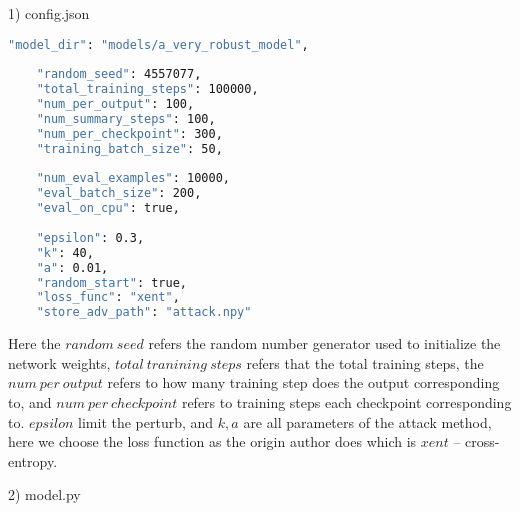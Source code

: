 \documentclass[
	letterpaper, %
	10pt, %
]{CSUniSchoolLabReport}
\begin{document}
1) config.json
\begin{lstlisting}[language=bash]
	"model_dir": "models/a_very_robust_model",
	
	"random_seed": 4557077,
	"total_training_steps": 100000,
	"num_per_output": 100,
	"num_summary_steps": 100,
	"num_per_checkpoint": 300,
	"training_batch_size": 50,
	
	"num_eval_examples": 10000,
	"eval_batch_size": 200,
	"eval_on_cpu": true,
	
	"epsilon": 0.3,
	"k": 40,
	"a": 0.01,
	"random_start": true,
	"loss_func": "xent",
	"store_adv_path": "attack.npy"
\end{lstlisting}
Here the $random \ seed$ refers the random number generator used to initialize the network weights, $total \ tranining \ steps$  refers that the total training steps, the $num \ per \ output$  refers to how many training step does the output corresponding to, and $num \ per \ checkpoint$ refers to training steps each checkpoint corresponding to. $epsilon$ limit the perturb, and $k, a$ are all parameters of the attack method, here we choose the loss function as the origin author does which is $xent$ -- cross-entropy.

2) model.py
\end{document}
